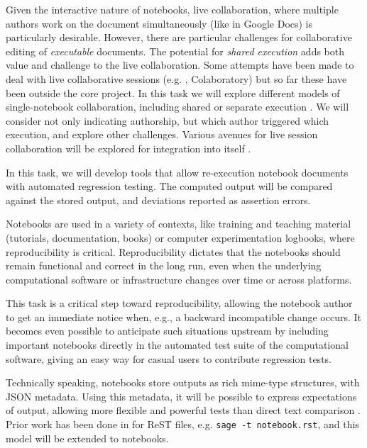 \begin{workpackage}
\begin{tasklist}
\begin{task}[id=notebook-collab,title=Notebook improvements for collaboration,lead=SR, partners={PS,USH,JU,USO}, PM=18, wphases=0-24]
  Given the interactive nature of \Jupyter notebooks, live
  collaboration, where multiple authors work on the document
  simultaneously (like in Google Docs) is particularly
  desirable. However, there are particular challenges for
  collaborative editing of \emph{executable} documents. The potential
  for \emph{shared execution} adds both value and challenge to the
  live collaboration. Some attempts have been made to deal with live
  collaborative sessions (e.g. \SMC, Colaboratory) but so far these
  have been outside the core \Jupyter project. In this task we will
  explore different models of single-notebook collaboration, including
  shared or separate execution . We will
  consider not only indicating authorship, but which author
  triggered which execution, and explore other challenges.  Various
  avenues for live session collaboration will be explored for
  integration into \Jupyter itself
  .
\end{task}

\begin{task}[id=notebook-verification,title=Reproducible Notebooks,lead=SR, partners={PS,USO}, PM=4, wphases=12-24]
  In this task, we will develop tools that allow re-execution
  notebook documents with automated regression testing. The computed
  output will be compared against the stored output, and deviations
  reported as assertion errors.

  Notebooks are used in a variety of contexts, like training and
  teaching material (tutorials, documentation, books) or computer
  experimentation logbooks, where reproducibility is
  critical. Reproducibility dictates that the notebooks should remain
  functional and correct in the long run, even when the underlying
  computational software or infrastructure changes over time or across
  platforms.

  This task is a critical step toward reproducibility, allowing the
  notebook author to get an immediate notice when, e.g., a backward
  incompatible change occurs. It becomes even possible to anticipate
  such situations upstream by including important notebooks directly
  in the automated test suite of the computational software, giving an
  easy way for casual users to contribute regression tests.

  Technically speaking, \Jupyter notebooks store outputs as rich mime-type structures,
  with JSON metadata. Using this metadata, it will be possible to express
  expectations of output, allowing more flexible and powerful tests
  than direct text comparison .
  Prior work has been done in \Sage for ReST files, e.g. \lstinline{sage -t notebook.rst},
  and this model will be extended to notebooks.
\end{task}


\end{tasklist}
\end{workpackage}
